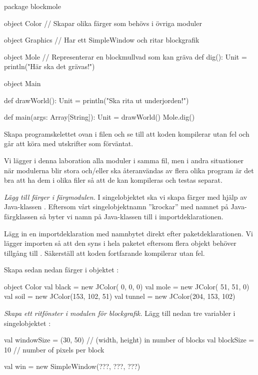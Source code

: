 \begin{Code}
package blockmole

object Color {
  // Skapar olika färger som behövs i övriga moduler
}

object Graphics {
  // Har ett SimpleWindow och ritar blockgrafik
}

object Mole { // Representerar en blockmullvad som kan gräva
  def dig(): Unit = println("Här ska det grävas!")
}

object Main {
  def drawWorld(): Unit = println("Ska rita ut underjorden!")

  def main(args: Array[String]): Unit = {
    drawWorld()
    Mole.dig()
  }
}
\end{Code}

\noindent Skapa programskelettet ovan i filen  och se till att koden kompilerar utan fel och går att köra med utskrifter som förväntat.

Vi lägger i denna laboration alla moduler i samma fil, men i andra situationer när  modulerna blir stora och/eller ska återanvändas av flera olika program är det bra att ha dem i olika filer så att de kan kompileras och testas separat.


\Task \emph{Lägg till färger i färgmodulen.} I singelobjektet  ska vi skapa färger med hjälp av Java-klassen . Eftersom vårt singelobjektnamn ''krockar'' med namnet på Java-färgklassen så byter vi namn på Java-klassen till  i importdeklarationen.

Lägg in en importdeklaration med namnbytet direkt efter paketdeklarationen. Vi lägger importen så att den syns i hela paketet eftersom flera objekt behöver tillgång till . Säkerställ att koden fortfarande kompilerar utan fel.

Skapa sedan nedan färger i objektet :
\begin{Code}
object Color {
  val black  = new JColor(  0,   0,   0)
  val mole   = new JColor( 51,  51,   0)
  val soil   = new JColor(153, 102,  51)
  val tunnel = new JColor(204, 153, 102)
}
\end{Code}


\Task \emph{Skapa ett ritfönster i modulen för blockgrafik.} Lägg till nedan tre variabler i singelobjektet :

\begin{Code}
  val windowSize = (30, 50)  // (width, height) in number of blocks
  val blockSize  = 10        // number of pixels per block

  val win = new SimpleWindow(???, ???, ???)
\end{Code}

